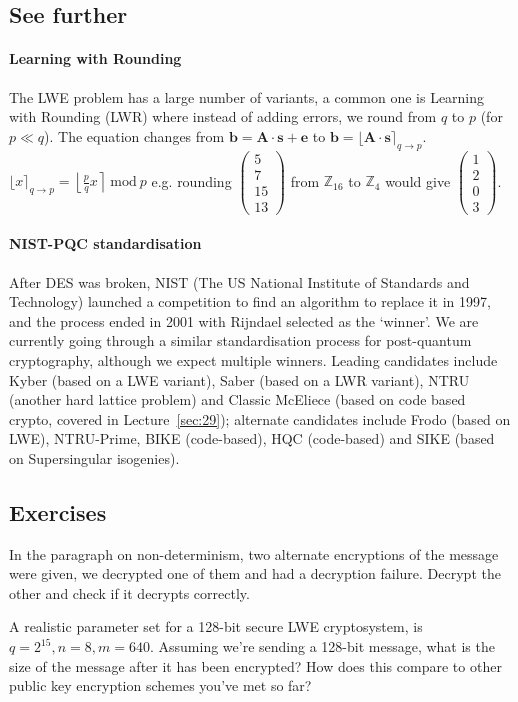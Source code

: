 \documentclass[a4paper, 11pt, openany]{book}
\begin{document}
\subsection{See further}
\paragraph{Learning with Rounding} The LWE problem has a large number of variants, a common one is Learning with Rounding (LWR) where instead of adding errors, we round from $q$ to $p$ (for $p \ll q$). The equation changes from $\textbf{b} = \textbf{A}\cdot\textbf{s} + \textbf{e}$ to $\textbf{b} = \lfloor\textbf{A}\cdot\textbf{s}\rceil_{q\rightarrow p}$.
\\
$\lfloor x \rceil_{q\rightarrow p} = \left\lfloor\frac{p}{q}x\right\rceil~\text{mod}~p$  e.g. rounding $\begin{pmatrix}5\\7\\15\\13\end{pmatrix}$ from  $\mathbb{Z}_{16}$ to  $\mathbb{Z}_{4}$ would give $\begin{pmatrix}1\\2\\0\\3\end{pmatrix}$.
\paragraph{NIST-PQC standardisation}
After DES was broken, NIST (The US National Institute of Standards and Technology) launched a competition to find an algorithm to replace it in 1997, and the process ended in 2001 with Rijndael selected as the `winner'. We are currently going through a similar standardisation process for post-quantum cryptography, although we expect multiple winners. Leading candidates include Kyber (based on a LWE variant), Saber (based on a LWR variant), NTRU (another hard lattice problem) and Classic McEliece (based on code based crypto, covered in Lecture~\ref{sec:29}); alternate candidates include Frodo (based on LWE), NTRU-Prime, BIKE (code-based), HQC (code-based) and SIKE (based on Supersingular isogenies).
\subsection{Exercises}
\begin{exercise}
	In the paragraph on non-determinism, two alternate encryptions of the message were given, we decrypted one of them and had a decryption failure. Decrypt the other and check if it decrypts correctly.
\end{exercise}
\begin{exercise}
	A realistic parameter set for a 128-bit secure LWE cryptosystem, is $q = 2^{15}, n = 8, m = 640$. Assuming we're sending a 128-bit message, what is the size of the message after it has been encrypted? How does this compare to other public key encryption schemes you've met so far?
\end{exercise}
\end{document}
